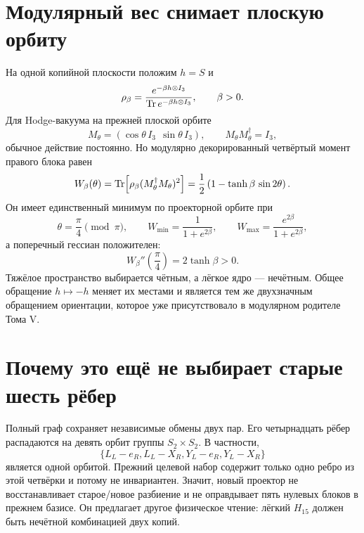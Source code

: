\section{Модулярный вес снимает плоскую орбиту}

На одной копийной плоскости положим $h=S$ и
\begin{equation}
 \rho_\beta=\frac{e^{-\beta h\otimes I_3}}
 {\operatorname{Tr} e^{-\beta h\otimes I_3}},
 \qquad \beta>0.
 \label{eq:v7-modular-copy-state}
\end{equation}
Для Hodge-вакуума на прежней плоской орбите
\begin{equation}
 M_\theta=(\cos\theta\,I_3\ \ \sin\theta\,I_3),
 \qquad M_\theta M_\theta^\dagger=I_3,
 \label{eq:v7-modular-copy-orbit}
\end{equation}
обычное действие постоянно. Но модулярно декорированный четвёртый момент
правого блока равен
\begin{equation}
 W_\beta(\theta)
 =\operatorname{Tr}\!\left[\rho_\beta(M_\theta^\dagger M_\theta)^2\right]
 =\frac12\left(1-\tanh\beta\,\sin2\theta\right).
 \label{eq:v7-modular-copy-weighted-moment}
\end{equation}
Он имеет единственный минимум по проекторной орбите при
\begin{equation}
 \theta=\frac\pi4\pmod\pi,
 \qquad
 W_{\min}=\frac1{1+e^{2\beta}},
 \qquad
 W_{\max}=\frac{e^{2\beta}}{1+e^{2\beta}},
 \label{eq:v7-modular-copy-extrema}
\end{equation}
а поперечный гессиан положителен:
\begin{equation}
 W_\beta''\!\left(\frac\pi4\right)=2\tanh\beta>0.
 \label{eq:v7-modular-copy-hessian}
\end{equation}
Тяжёлое пространство выбирается чётным, а лёгкое ядро --- нечётным. Общее
обращение $h\mapsto-h$ меняет их местами и является тем же двухзначным
обращением ориентации, которое уже присутствовало в модулярном родителе
Тома V.

\section{Почему это ещё не выбирает старые шесть рёбер}

Полный граф сохраняет независимые обмены двух пар. Его четырнадцать рёбер
распадаются на девять орбит группы $S_2\times S_2$. В частности,
\begin{equation}
 \{L_L-e_R,L_L-X_R,Y_L-e_R,Y_L-X_R\}
 \label{eq:v7-modular-copy-four-edge-orbit}
\end{equation}
является одной орбитой. Прежний целевой набор содержит только одно ребро из
этой четвёрки и потому не инвариантен. Значит, новый проектор не восстанавливает
старое/новое разбиение и не оправдывает пять нулевых блоков в прежнем базисе.
Он предлагает другое физическое чтение: лёгкий $H_{15}$ должен быть
нечётной комбинацией двух копий.

